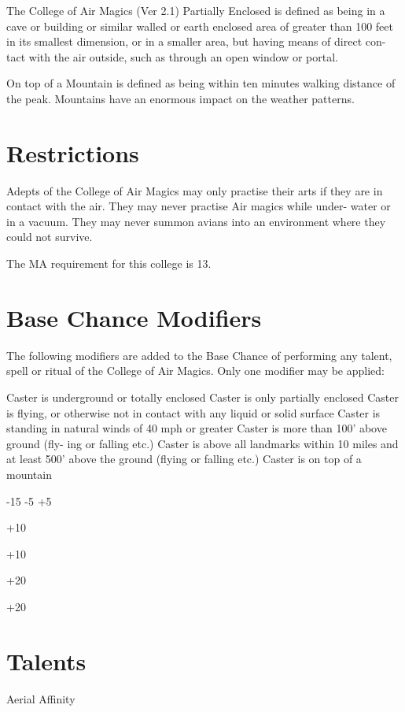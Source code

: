 \begin{Chapter}{The College of Air Magics (Ver 2.1)}
Partially Enclosed is defined as being in a cave or 
building or similar walled or earth enclosed area of 
greater  than  100  feet  in  its  smallest  dimension,  or 
in  a  smaller  area,  but  having  means  of  direct  con-
tact  with  the  air  outside,  such  as  through  an  open 
window or portal. 

On top of a Mountain is defined as being within ten 
minutes  walking  distance  of  the  peak.  Mountains 
have an enormous impact on the weather patterns. 

\section{Restrictions}

Adepts  of  the  College  of  Air  Magics  may  only 
practise their arts if they are in contact with the air. 
They  may  never  practise  Air  magics  while  under-
water  or  in  a  vacuum.  They  may  never  summon 
avians  into  an  environment  where  they  could  not 
survive. 

The MA requirement for this college is 13. 

\section{Base Chance Modifiers}

The  following  modifiers  are  added  to  the  Base 
Chance  of  performing  any  talent,  spell  or  ritual  of 
the College of Air Magics. Only one modifier may 
be applied: 

Caster is underground or totally enclosed 
Caster is only partially enclosed 
Caster is flying, or otherwise not in contact 
with any liquid or solid surface 
Caster is standing in natural winds of 40 mph 
or greater 
Caster is more than 100’ above ground (fly-
ing or falling etc.) 
Caster is above all landmarks within 10 miles 
and at least 500’ above the ground (flying or 
falling etc.) 
Caster is on top of a mountain 

-15 
-5 
+5 

+10 

+10 

+20 

+20 


\section{Talents}

\begin{talent}[T-1]{Aerial Affinity }


\end{talent}
\end{Chapter}
